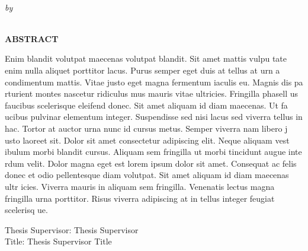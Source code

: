 \begin{center}
{\large \@title} \\
\emph{\footnotesize by} \\
\@author \\
\end{center}
%
\noindent \textbf{ABSTRACT} %

\noindent Enim blandit volutpat maecenas volutpat blandit. Sit amet mattis vulpu
tate enim nulla aliquet porttitor lacus. Purus semper eget duis at tellus at urn
a condimentum mattis. Vitae justo eget magna fermentum iaculis eu. Magnis dis pa
rturient montes nascetur ridiculus mus mauris vitae ultricies. Fringilla phasell
us faucibus scelerisque eleifend donec. Sit amet aliquam id diam maecenas. Ut fa
ucibus pulvinar elementum integer. Suspendisse sed nisi lacus sed viverra tellus
 in hac. Tortor at auctor urna nunc id cursus metus. Semper viverra nam libero j
usto laoreet sit. Dolor sit amet consectetur adipiscing elit. Neque aliquam vest
ibulum morbi blandit cursus. Aliquam sem fringilla ut morbi tincidunt augue inte
rdum velit. Dolor magna eget est lorem ipsum dolor sit amet. Consequat ac felis 
donec et odio pellentesque diam volutpat. Sit amet aliquam id diam maecenas ultr
icies. Viverra mauris in aliquam sem fringilla. Venenatis lectus magna fringilla
 urna porttitor. Risus viverra adipiscing at in tellus integer feugiat scelerisq
ue. \\

\begin{singlespace}
\small{
\noindent Thesis Supervisor: Thesis Supervisor \\
\noindent Title: Thesis Supervisor Title}
\end{singlespace}
